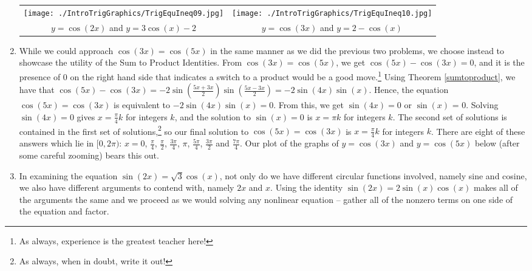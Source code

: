 \begin{ex}
\begin{enumerate}
\begin{center}

\begin{tabular}{cc}

\texttt{[image: ./IntroTrigGraphics/TrigEquIneq09.jpg]} &

\hspace{0.75in} \texttt{[image: ./IntroTrigGraphics/TrigEquIneq10.jpg]} \\

$y = \cos(2x)$ and \boldmath  $y = 3\cos(x) - 2$   & 

 \hspace{0.75in} $y = \cos(3x)$ and \boldmath $y = 2- \cos(x)$ \\
 
 \end{tabular}

\end{center}


\item  While we could approach  $\cos(3x) = \cos(5x)$ in the same manner as we did the previous two problems, we choose instead to showcase the utility of the Sum to Product Identities.  From $\cos(3x) = \cos(5x)$, we get $\cos(5x) - \cos(3x) = 0$, and it is the presence of $0$ on the right hand side that indicates a switch to a product would be a good move.\footnote{As always, experience is the greatest teacher here!}  Using Theorem \ref{sumtoproduct}, we have that $\cos(5x) - \cos(3x)  = - 2 \sin\left( \frac{5x + 3x}{2}\right)\sin\left( \frac{5x - 3x}{2}\right) = -2 \sin(4x)\sin(x)$.  Hence, the equation $\cos(5x) = \cos(3x)$ is equivalent to $-2 \sin(4x) \sin(x) = 0$.  From this, we get $\sin(4x) = 0$ or $\sin(x)$ = 0.  Solving $\sin(4x) = 0$ gives $x = \frac{\pi}{4} k$ for integers $k$, and the solution to $\sin(x) = 0$ is $x = \pi k$ for integers $k$.  The second set of solutions is contained in the first set of solutions,\footnote{As always, when in doubt, write it out!} so our final solution to $\cos(5x) = \cos(3x)$ is $x = \frac{\pi}{4} k$ for integers $k$.  There are eight of these answers which lie in $[0,2\pi)$:  $x = 0$, $\frac{\pi}{4}$, $\frac{\pi}{2}$, $\frac{3\pi}{4}$, $\pi$, $\frac{5\pi}{4}$, $\frac{3\pi}{2}$ and $\frac{7\pi}{4}$.  Our plot of the graphs of $y = \cos(3x)$ and $y = \cos(5x)$ below (after some careful zooming) bears this out. 

\item  In examining the equation   $\sin(2x) =\sqrt{3} \cos(x)$, not only do we have different circular functions involved, namely sine and cosine, we also have different arguments to contend with, namely $2x$ and $x$.  Using the identity $\sin(2x) = 2 \sin(x) \cos(x)$ makes all of the arguments the same and we proceed as we would solving any nonlinear equation -- gather all of the nonzero terms on one side of the equation and factor.


\end{enumerate}
\end{ex}
